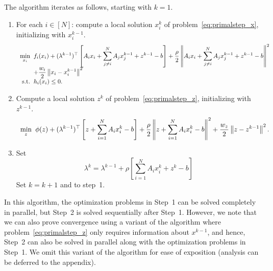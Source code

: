 \documentclass[11pt]{article}
\newcommand{\norm}[1]{\left\lVert #1 \right\rVert}
\begin{document}
The algorithm iterates as follows, starting with $k = 1$.
\begin{enumerate}
    \item For each $i \in [N]$: compute a local solution $x_i^k$ of problem~\eqref{eq:primalstep_x}, initializing with $x_i^{k-1}$.
    \begin{equation}\label{eq:primalstep_x}
    \begin{array}{r@{\;\;}l}
    \displaystyle\mathop{\text{min}}_{x_i} & \displaystyle f_i(x_i) + (\lambda^{k-1})^\top \left[ A_ix_i + \sum_{j \neq i}^N A_j x_j^{k-1} + z^{k-1} - b\right] + \frac{\rho}{2} \norm{A_ix_i + \sum_{j \neq i}^N A_j x_j^{k-1} + z^{k-1} - b}^2  \\
    &\displaystyle + \frac{w_i}{2} \norm{x_i - x_i^{k-1}}^2\\
    \text{s.t.} & \displaystyle  h_i(x_i) \leq 0.
    \end{array}
    \end{equation}
    
    \item Compute a local solution $z^k$ of problem~\eqref{eq:primalstep_z}, initializing with $z^{k-1}$.
    \begin{equation}\label{eq:primalstep_z}
    \begin{array}{r@{\;\;}l}
    \displaystyle\mathop{\text{min}}_{z} & \displaystyle \phi(z) + (\lambda^{k-1})^\top \left[z + \sum_{i=1}^N A_i x_i^{k} - b\right] + \frac{\rho}{2} \norm{z + \sum_{i = 1}^N A_ix_i^k - b}^2  \displaystyle  + \frac{w_z}{2} \norm{z - z^{k-1}}^2.
    \end{array}
        \end{equation}
    
    \item Set
    \begin{equation}\label{eq:dualstep}
    \lambda^k = \lambda^{k - 1} + \rho \left[\sum_{i = 1}^N A_i x_i^k + z^k - b\right]
    \end{equation}
    Set $k = k + 1$ and to step~1.
\end{enumerate}

In this algorithm, the optimization problems in Step~1 can be solved completely in parallel, but Step~2 is solved sequentially after Step~1.
However, we note that we can also prove convergence using a variant of the algorithm where problem~\eqref{eq:primalstep_z} only requires information about $x^{k-1}$, and hence, Step~2 can also be solved in parallel along with the optimization problems in Step~1.
We omit this variant of the algorithm for ease of exposition (analysis can be deferred to the appendix).
\end{document}
